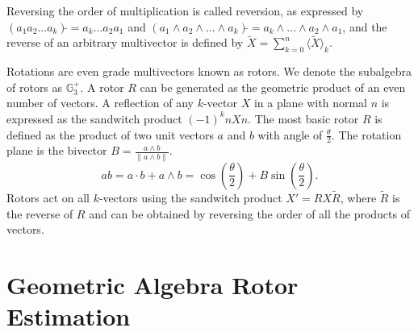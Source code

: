 \documentclass{birkjour}
\numberwithin{equation}{section}
\begin{document}
Reversing the order of multiplication is called reversion, as expressed by $(a_1 a_2 ... a_k)\tilde{} = a_k ... a_2 a_1$ and $(a_1 \wedge a_2 \wedge ... \wedge a_k)\tilde{} = a_k \wedge ... \wedge a_2 \wedge a_1$, and the reverse of an arbitrary multivector is defined by $\tilde{X} = \sum_{k=0}^n { \langle \tilde{X} \rangle_k }$.

Rotations are even grade multivectors known as rotors. We denote the subalgebra of rotors as $\mathbb{G}^{+}_3$. A rotor $R$ can be generated as the geometric product of an even number of vectors. A reflection of any $k$-vector $X$ in a plane with normal $n$ is expressed as the sandwitch product $(-1)^k n X n$. The most basic rotor $R$ is defined as the product of two unit vectors $a$ and $b$ with angle of $\frac{\theta}{2}$. The rotation plane is the bivector $B = \frac{a \wedge b}{\| a \wedge b \|}$.
\begin{equation*}
a b = a \cdot b + a \wedge b = \cos\left( \frac{\theta}{2} \right) + B \sin\left( \frac{\theta}{2} \right).
\end{equation*}
Rotors act on all $k$-vectors using the sandwitch product $X' = R X \tilde R$, where $\tilde R$ is the reverse of $R$ and can be obtained by reversing the order of all the products of vectors.

\section{Geometric Algebra Rotor Estimation}
\end{document}
